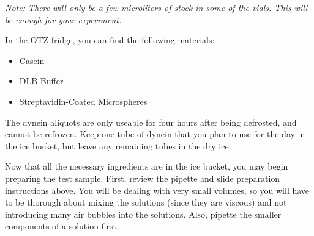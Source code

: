 \documentclass{../lab}
\begin{document}
\emph{Note: There will only be a few microliters of stock in some of the vials. This will be enough for your experiment.}

In the OTZ fridge, you can find the following materials:

\begin{itemize}
    \item Casein

    \item DLB Buffer

    \item Streptavidin-Coated Microspheres

\end{itemize}

The dynein aliquots are only useable for four hours after being defrosted, and cannot be refrozen. Keep one tube of dynein that you plan to use for the day in the ice bucket, but leave any remaining tubes in the dry ice.

Now that all the necessary ingredients are in the ice bucket, you may begin preparing the test sample. First, review the pipette and slide preparation instructions above. You will be dealing with very small volumes, so you will have to be thorough about mixing the solutions (since they are viscous) and not introducing many air bubbles into the solutions. Also, pipette the smaller components of a solution first.
\end{document}
